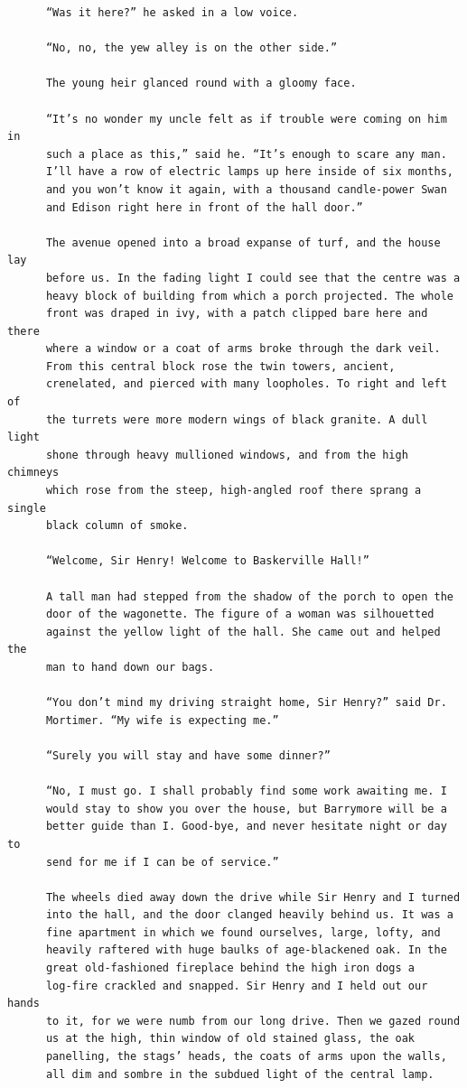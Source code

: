 \documentclass{article}
\begin{document}
\begin{verbatim}
      “Was it here?” he asked in a low voice.

      “No, no, the yew alley is on the other side.”

      The young heir glanced round with a gloomy face.

      “It’s no wonder my uncle felt as if trouble were coming on him in
      such a place as this,” said he. “It’s enough to scare any man.
      I’ll have a row of electric lamps up here inside of six months,
      and you won’t know it again, with a thousand candle-power Swan
      and Edison right here in front of the hall door.”

      The avenue opened into a broad expanse of turf, and the house lay
      before us. In the fading light I could see that the centre was a
      heavy block of building from which a porch projected. The whole
      front was draped in ivy, with a patch clipped bare here and there
      where a window or a coat of arms broke through the dark veil.
      From this central block rose the twin towers, ancient,
      crenelated, and pierced with many loopholes. To right and left of
      the turrets were more modern wings of black granite. A dull light
      shone through heavy mullioned windows, and from the high chimneys
      which rose from the steep, high-angled roof there sprang a single
      black column of smoke.

      “Welcome, Sir Henry! Welcome to Baskerville Hall!”

      A tall man had stepped from the shadow of the porch to open the
      door of the wagonette. The figure of a woman was silhouetted
      against the yellow light of the hall. She came out and helped the
      man to hand down our bags.

      “You don’t mind my driving straight home, Sir Henry?” said Dr.
      Mortimer. “My wife is expecting me.”

      “Surely you will stay and have some dinner?”

      “No, I must go. I shall probably find some work awaiting me. I
      would stay to show you over the house, but Barrymore will be a
      better guide than I. Good-bye, and never hesitate night or day to
      send for me if I can be of service.”

      The wheels died away down the drive while Sir Henry and I turned
      into the hall, and the door clanged heavily behind us. It was a
      fine apartment in which we found ourselves, large, lofty, and
      heavily raftered with huge baulks of age-blackened oak. In the
      great old-fashioned fireplace behind the high iron dogs a
      log-fire crackled and snapped. Sir Henry and I held out our hands
      to it, for we were numb from our long drive. Then we gazed round
      us at the high, thin window of old stained glass, the oak
      panelling, the stags’ heads, the coats of arms upon the walls,
      all dim and sombre in the subdued light of the central lamp.


\end{verbatim}
\end{document}
